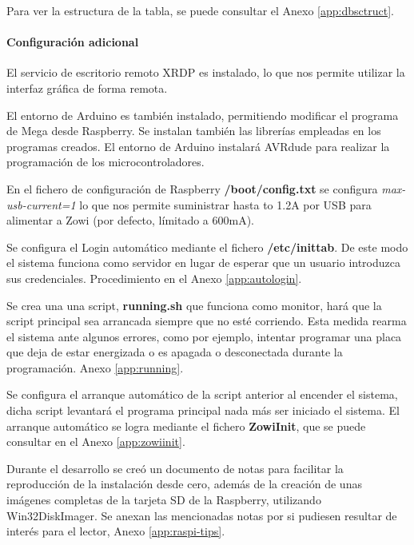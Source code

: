 Para ver la estructura de la tabla, se puede consultar el Anexo \ref{app:dbsctruct}.

\paragraph{Configuración adicional}
El servicio de escritorio remoto XRDP es instalado, lo que nos permite utilizar la interfaz gráfica de forma remota.

El entorno de Arduino es también instalado, permitiendo modificar el programa de Mega desde Raspberry. Se instalan también las librerías empleadas en los programas creados. El entorno de Arduino instalará AVRdude para realizar la programación de los microcontroladores.

En el fichero de configuración de Raspberry \textbf{/boot/config.txt} se configura \textit{max-usb-current=1} lo que nos permite suministrar hasta to 1.2A por USB para alimentar a Zowi (por defecto, límitado a 600mA).

Se configura el Login automático mediante el fichero \textbf{/etc/inittab}. De este modo el sistema funciona como servidor en lugar de esperar que un usuario introduzca sus credenciales. Procedimiento en el Anexo \ref{app:autologin}.

Se crea una una script, \textbf{running.sh} que funciona como monitor, hará que la script principal sea arrancada siempre que no esté corriendo. Esta medida rearma el sistema ante algunos errores, como por ejemplo, intentar programar una placa que deja de estar energizada o es apagada o desconectada durante la programación. Anexo \ref{app:running}.

Se configura el arranque automático de la script anterior al encender el sistema, dicha script levantará el programa principal nada más ser iniciado el sistema. El arranque automático se logra mediante el fichero \textbf{ZowiInit}, que se puede consultar en el Anexo \ref{app:zowiinit}.

Durante el desarrollo se creó un documento de notas para facilitar la reproducción de la instalación desde cero, además de la creación de unas imágenes completas de la tarjeta SD de la Raspberry, utilizando Win32DiskImager. Se anexan las mencionadas notas por si pudiesen resultar de interés para el lector, Anexo \ref{app:raspi-tips}.

